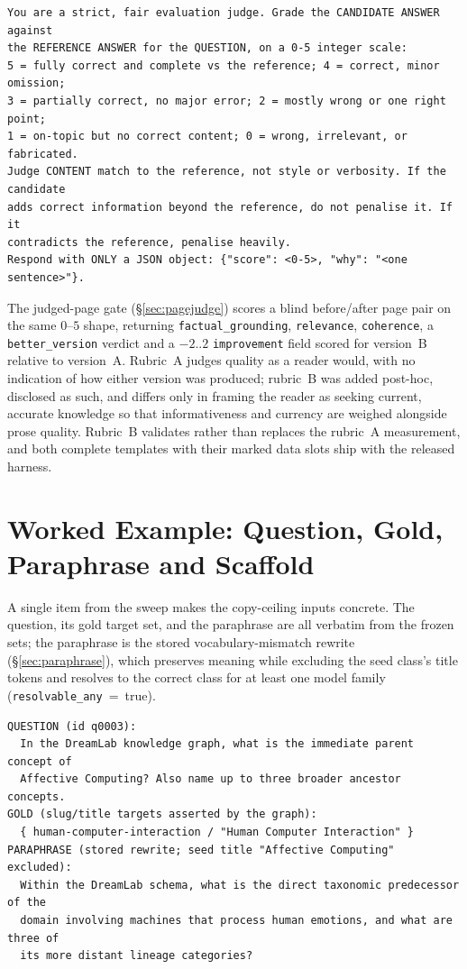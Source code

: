 \documentclass[10pt,twocolumn]{article}
\begin{document}
{\footnotesize\begin{verbatim}
You are a strict, fair evaluation judge. Grade the CANDIDATE ANSWER against
the REFERENCE ANSWER for the QUESTION, on a 0-5 integer scale:
5 = fully correct and complete vs the reference; 4 = correct, minor omission;
3 = partially correct, no major error; 2 = mostly wrong or one right point;
1 = on-topic but no correct content; 0 = wrong, irrelevant, or fabricated.
Judge CONTENT match to the reference, not style or verbosity. If the candidate
adds correct information beyond the reference, do not penalise it. If it
contradicts the reference, penalise heavily.
Respond with ONLY a JSON object: {"score": <0-5>, "why": "<one sentence>"}.
\end{verbatim}}

\noindent The judged-page gate (\S\ref{sec:pagejudge}) scores a blind before/after page pair on the
same $0$--$5$ shape, returning \texttt{factual\_grounding}, \texttt{relevance}, \texttt{coherence}, a
\texttt{better\_version} verdict and a $-2..2$ \texttt{improvement} field scored for version~B relative
to version~A. Rubric~A judges quality as a reader would, with no indication of how either version was
produced; rubric~B was added post-hoc, disclosed as such, and differs only in framing the reader as
seeking current, accurate knowledge so that informativeness and currency are weighed alongside prose
quality. Rubric~B validates rather than replaces the rubric~A measurement, and both complete templates
with their marked data slots ship with the released harness.

\section{Worked Example: Question, Gold, Paraphrase and Scaffold}\label{sec:appendix-samples}
A single item from the sweep makes the copy-ceiling inputs concrete. The question, its gold
target set, and the paraphrase are all verbatim from the frozen sets; the paraphrase is the
stored vocabulary-mismatch rewrite (\S\ref{sec:paraphrase}), which preserves meaning while
excluding the seed class's title tokens and resolves to the correct class for at least one
model family (\texttt{resolvable\_any}~=~true).

{\footnotesize\begin{verbatim}
QUESTION (id q0003):
  In the DreamLab knowledge graph, what is the immediate parent concept of
  Affective Computing? Also name up to three broader ancestor concepts.
GOLD (slug/title targets asserted by the graph):
  { human-computer-interaction / "Human Computer Interaction" }
PARAPHRASE (stored rewrite; seed title "Affective Computing" excluded):
  Within the DreamLab schema, what is the direct taxonomic predecessor of the
  domain involving machines that process human emotions, and what are three of
  its more distant lineage categories?
\end{verbatim}}
\end{document}
